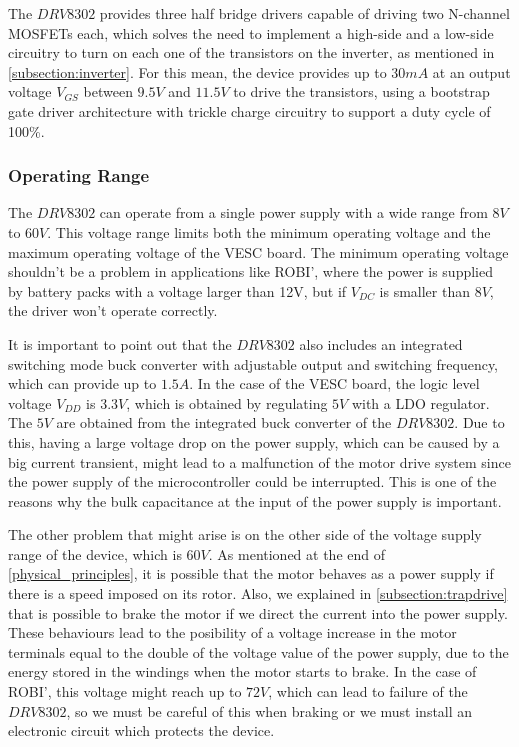 The $DRV8302$ provides three half bridge drivers capable of driving two N-channel MOSFETs each, which solves the need to implement a high-side and a low-side circuitry to turn on each one of the transistors on the inverter, as mentioned in \ref{subsection:inverter}. For this mean, the device provides up to $30 mA$ at an output voltage $V_{GS}$ between $9.5V$ and $11.5V$ to drive the transistors, using a bootstrap gate driver architecture with trickle charge circuitry to support a duty cycle of 100\%.	

\subsubsection{Operating Range}

The $DRV8302$ can operate from a single power supply with a wide range from $8V$ to $60V$. This voltage range limits both the minimum operating voltage and the maximum operating voltage of the VESC board. The minimum operating voltage shouldn't be a problem in applications like ROBI', where the power is supplied by battery packs with a voltage larger than 12V, but if $V_{DC}$ is smaller than $8V$, the driver won't operate correctly. 

It is important to point out that the $DRV8302$ also includes an integrated switching mode buck converter with adjustable output and switching frequency, which can provide up to $1.5 A$. In the case of the VESC board, the logic level voltage $V_{DD}$ is $3.3V$, which is obtained by regulating $5V$ with a \acf{LDO} regulator. The $5V$ are obtained from the integrated buck converter of the $DRV8302$. Due to this, having a large voltage drop on the power supply, which can be caused by a big current transient, might lead to a malfunction of the motor drive system since the power supply of the microcontroller could be interrupted. This is one of the reasons why the bulk capacitance at the input of the power supply is important.

The other problem that might arise is on the other side of the voltage supply range of the device, which is $60V$. As mentioned at the end of \ref{physical_principles}, it is possible that the motor behaves as a power supply if there is a speed imposed on its rotor. Also, we explained in \ref{subsection:trapdrive} that is possible to brake the motor if we direct the current into the power supply. These behaviours lead to the posibility of a voltage increase in the motor terminals equal to the double of the voltage value of the power supply, due to the energy stored in the windings when the motor starts to brake. In the case of ROBI', this voltage might reach up to $72V$, which can lead to failure of the $DRV8302$, so we must be careful of this when braking or we must install an electronic circuit which protects the device.

